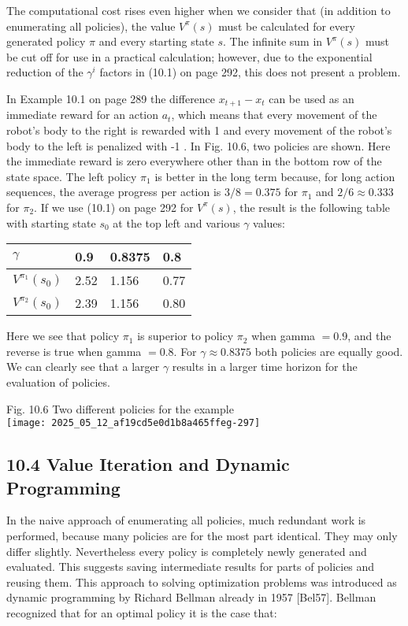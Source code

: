 \documentclass[10pt]{article}
\begin{document}
The computational cost rises even higher when we consider that (in addition to enumerating all policies), the value $V^{\pi}(s)$ must be calculated for every generated policy $\pi$ and every starting state $s$. The infinite sum in $V^{\pi}(s)$ must be cut off for use in a practical calculation; however, due to the exponential reduction of the $\gamma^{i}$ factors in (10.1) on page 292, this does not present a problem.

In Example 10.1 on page 289 the difference $x_{t+1}-x_{t}$ can be used as an immediate reward for an action $a_{t}$, which means that every movement of the robot's body to the right is rewarded with 1 and every movement of the robot's body to the left is penalized with -1 . In Fig. 10.6, two policies are shown. Here the immediate reward is zero everywhere other than in the bottom row of the state space. The left policy $\pi_{1}$ is better in the long term because, for long action sequences, the average progress per action is $3 / 8=0.375$ for $\pi_{1}$ and $2 / 6 \approx 0.333$ for $\pi_{2}$. If we use (10.1) on page 292 for $V^{\pi}(s)$, the result is the following table with starting state $s_{0}$ at the top left and various $\gamma$ values:

\begin{center}
\begin{tabular}{llll}
$\gamma$ & 0.9 & 0.8375 & 0.8 \\
\hline
$V^{\pi_{1}}\left(s_{0}\right)$ & 2.52 & 1.156 & 0.77 \\
\hline
$V^{\pi_{2}}\left(s_{0}\right)$ & 2.39 & 1.156 & 0.80 \\
\hline
\end{tabular}
\end{center}

Here we see that policy $\pi_{1}$ is superior to policy $\pi_{2}$ when gamma $=0.9$, and the reverse is true when gamma $=0.8$. For $\gamma \approx 0.8375$ both policies are equally good. We can clearly see that a larger $\gamma$ results in a larger time horizon for the evaluation of policies.

Fig. 10.6 Two different policies for the example\\
\texttt{[image: 2025\_05\_12\_af19cd5e0d1b8a465ffeg-297]}

\subsection*{10.4 Value Iteration and Dynamic Programming}
In the naive approach of enumerating all policies, much redundant work is performed, because many policies are for the most part identical. They may only differ slightly. Nevertheless every policy is completely newly generated and evaluated. This suggests saving intermediate results for parts of policies and reusing them. This approach to solving optimization problems was introduced as dynamic programming by Richard Bellman already in 1957 [Bel57]. Bellman recognized that for an optimal policy it is the case that:
\end{document}
